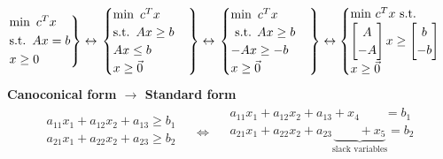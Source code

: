 \begin{gather*}
\begin{rcases}
	\text{min} \hspace{0.5em}  c^Tx \hspace{0.5em} \\ \text{s.t.} \hspace{0.5em} Ax = b\\
	x \geq 0
\end{rcases}
\leftrightarrow 
\begin{rcases}
	\begin{cases}
	\text{min} \hspace{0.5em} c^Tx \hspace{0.5em} \\ \text{s.t.} \hspace{0.5em}Ax \geq b\\
Ax \leq b\\
x \geq \vec{0}
\end{cases}
\end{rcases} \leftrightarrow
\begin{rcases}
	\begin{cases}
	\text{min} \hspace{0.5em} c^Tx \\ \text{ s.t. } Ax \geq b\\
	-Ax \geq -b\\
	x \geq \vec{0}
\end{cases}
\end{rcases} \leftrightarrow
\begin{cases}
	\text{min } c^Tx \text{ s.t. }\\
	\begin{bmatrix}
		A\\
		-A
	\end{bmatrix} x \geq 
	\begin{bmatrix}
		b\\-b
	\end{bmatrix}\\
	x \geq \vec{0}
\end{cases}
\end{gather*}
\textbf{Canoconical form $\rightarrow$ Standard form}
\begin{gather*}
	\begin{split}
		a_{11}x_1 + a_{12}x_2 + a_{13} \geq b_1\\
		a_{21}x_1 + a_{22}x_2 + a_{23} \geq b_2\\
	\end{split} \quad \Longleftrightarrow \quad
	\begin{split}
		a_{11}x_1 + a_{12}x_2 + a_{13} + x_4 \qquad = b_1\\
		a_{21}x_1 + a_{22}x_2 + a_{23} \underbrace{ \qquad + x_5}_{\text{slack variables}}= b_2\\
	\end{split}
\end{gather*}
